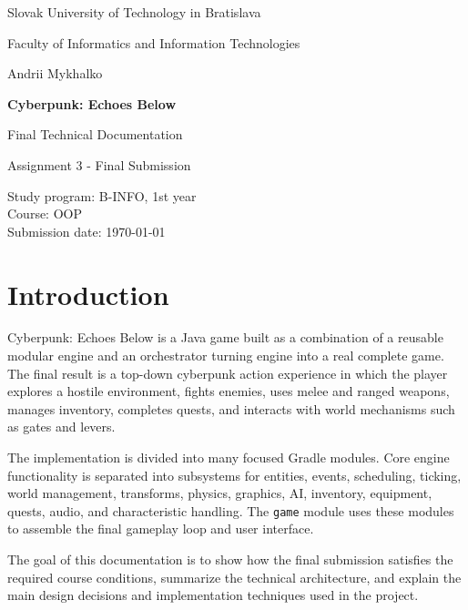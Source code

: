 \documentclass[12pt]{extarticle}
\begin{document}
\begin{titlepage}
    \centering
    {\Large Slovak University of Technology in Bratislava\par}
    \vspace{0.5cm}
    {\Large Faculty of Informatics and Information Technologies\par}
    \vfill
    {\Large Andrii Mykhalko\par}
    \vspace{1.2cm}
    {\Huge \textbf{Cyberpunk: Echoes Below}\par}
    \vspace{0.4cm}
    {\Large Final Technical Documentation\par}
    \vspace{0.4cm}
    {\large Assignment 3 - Final Submission\par}
    \vfill
    \begin{flushright}
        Study program: B-INFO, 1st year\\
        Course: OOP\\
        Submission date: \today
    \end{flushright}
\end{titlepage}

\tableofcontents
\newpage

\section{Introduction}
Cyberpunk: Echoes Below is a Java game built as a combination of a reusable modular engine and an orchestrator turning engine into a real complete game. The final result is a top-down cyberpunk action experience in which the player explores a hostile environment, fights enemies, uses melee and ranged weapons, manages inventory, completes quests, and interacts with world mechanisms such as gates and levers.

The implementation is divided into many focused Gradle modules. Core engine functionality is separated into subsystems for entities, events, scheduling, ticking, world management, transforms, physics, graphics, AI, inventory, equipment, quests, audio, and characteristic handling. The \texttt{game} module uses these modules to assemble the final gameplay loop and user interface.

The goal of this documentation is to show how the final submission satisfies the required course conditions, summarize the technical architecture, and explain the main design decisions and implementation techniques used in the project.
\end{document}
